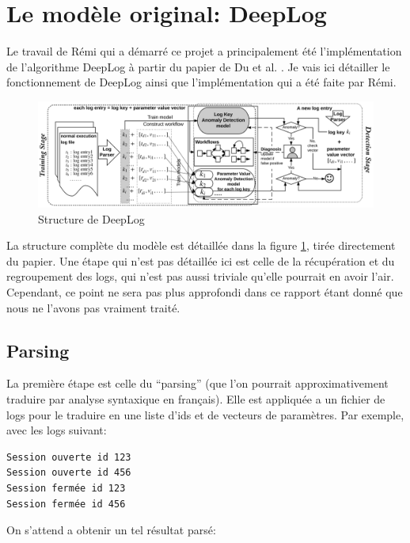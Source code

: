 \documentclass[openany, 12pt]{memoir}
\begin{document}

\section{Le modèle original: DeepLog}

Le travail de Rémi qui a démarré ce projet a principalement été l'implémentation de l'algorithme DeepLog à partir du papier de Du et al. \cite{deeplog}. Je vais ici détailler le fonctionnement de DeepLog ainsi que l'implémentation qui a été faite par Rémi.

\begin{figure}[ht]
	\centering
	\includegraphics[width=\textwidth]{images/deeplog.png}
	\caption{Structure de DeepLog}
	\label{deeplog}
\end{figure}

La structure complète du modèle est détaillée dans la figure \ref{deeplog}, tirée directement du papier. Une étape qui n'est pas détaillée ici est celle de la récupération et du regroupement des \glspl{log}, qui n'est pas aussi triviale qu'elle pourrait en avoir l'air. Cependant, ce point ne sera pas plus approfondi dans ce rapport étant donné que nous ne l'avons pas vraiment traité.

\subsection{Parsing}

La première étape est celle du ``parsing'' (que l'on pourrait approximativement traduire par analyse syntaxique en français). Elle est appliquée a un fichier de \glspl{log} pour le traduire en une liste d'ids et de vecteurs de paramètres. Par exemple, avec les \glspl{log} suivant:

\begin{lstlisting}
Session ouverte id 123
Session ouverte id 456
Session fermée id 123
Session fermée id 456
\end{lstlisting}

On s'attend a obtenir un tel résultat parsé:
\end{document}
